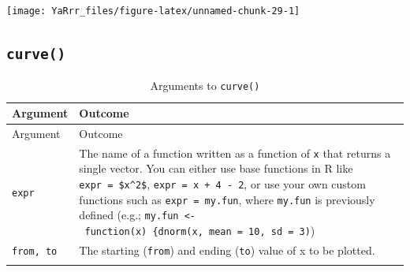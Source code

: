 \documentclass[]{book}
\theoremstyle{definition}
\theoremstyle{definition}
\theoremstyle{remark}
\begin{document}
\begin{center}\texttt{[image: YaRrr\_files/figure-latex/unnamed-chunk-29-1]} \end{center}

\subsection{\texorpdfstring{\texttt{curve()}}{curve()}}\label{curve}

\begin{longtable}[]{@{}ll@{}}
\caption{\label{tab:curvearguments} Arguments to
\texttt{curve()}}\tabularnewline
\toprule
\begin{minipage}[b]{0.14\columnwidth}\raggedright\strut
Argument\strut
\end{minipage} & \begin{minipage}[b]{0.71\columnwidth}\raggedright\strut
Outcome\strut
\end{minipage}\tabularnewline
\midrule
\endfirsthead
\toprule
\begin{minipage}[b]{0.14\columnwidth}\raggedright\strut
Argument\strut
\end{minipage} & \begin{minipage}[b]{0.71\columnwidth}\raggedright\strut
Outcome\strut
\end{minipage}\tabularnewline
\midrule
\endhead
\begin{minipage}[t]{0.14\columnwidth}\raggedright\strut
\texttt{expr}\strut
\end{minipage} & \begin{minipage}[t]{0.71\columnwidth}\raggedright\strut
The name of a function written as a function of \texttt{x} that returns
a single vector. You can either use base functions in R like
\texttt{expr\ =\ \$x\^{}2\$}, \texttt{expr\ =\ x\ +\ 4\ -\ 2}, or use
your own custom functions such as \texttt{expr\ =\ my.fun}, where
\texttt{my.fun} is previously defined (e.g.;
\texttt{my.fun\ \textless{}-\ function(x)\ \{dnorm(x,\ mean\ =\ 10,\ sd\ =\ 3)})\strut
\end{minipage}\tabularnewline
\begin{minipage}[t]{0.14\columnwidth}\raggedright\strut
\texttt{from,\ to}\strut
\end{minipage} & \begin{minipage}[t]{0.71\columnwidth}\raggedright\strut
The starting (\texttt{from}) and ending (\texttt{to}) value of x to be
plotted.\strut
\end{minipage}\tabularnewline
\begin{minipage}[t]{0.14\columnwidth}\raggedright\strut

\end{minipage}
\end{longtable}
\end{document}
